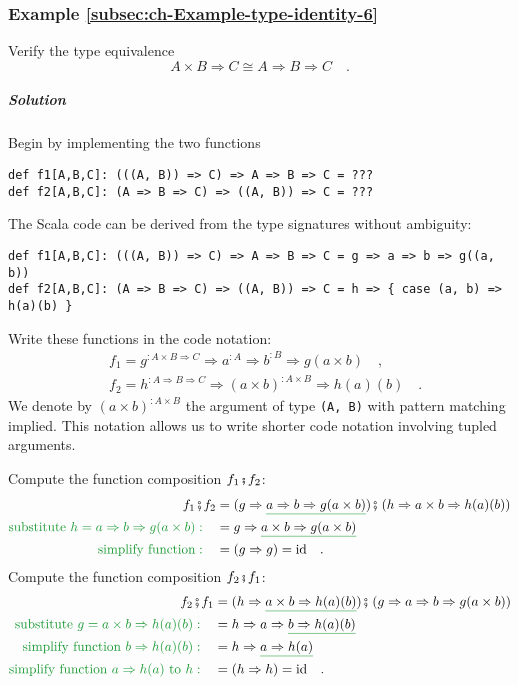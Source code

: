 \subsubsection{Example \label{subsec:ch-Example-type-identity-6}\ref{subsec:ch-Example-type-identity-6}}

Verify the type equivalence 
\[
A\times B\Rightarrow C\cong A\Rightarrow B\Rightarrow C\quad.
\]


\subparagraph{Solution}

Begin by implementing the two functions
\begin{lstlisting}
def f1[A,B,C]: (((A, B)) => C) => A => B => C = ???
def f2[A,B,C]: (A => B => C) => ((A, B)) => C = ???
\end{lstlisting}
The Scala code can be derived from the type signatures without ambiguity:
\begin{lstlisting}
def f1[A,B,C]: (((A, B)) => C) => A => B => C = g => a => b => g((a, b))
def f2[A,B,C]: (A => B => C) => ((A, B)) => C = h => { case (a, b) => h(a)(b) }
\end{lstlisting}
Write these functions in the code notation:
\begin{align*}
 & f_{1}=g^{:A\times B\Rightarrow C}\Rightarrow a^{:A}\Rightarrow b^{:B}\Rightarrow g(a\times b)\quad,\\
 & f_{2}=h^{:A\Rightarrow B\Rightarrow C}\Rightarrow\left(a\times b\right)^{:A\times B}\Rightarrow h(a)(b)\quad.
\end{align*}
We denote by $\left(a\times b\right)^{:A\times B}$ the argument of
type \lstinline!(A, B)! with pattern matching implied. This notation
allows us to write shorter code notation involving tupled arguments.

Compute the function composition $f_{1}\bef f_{2}$:
\begin{align*}
f_{1}\bef f_{2} & =(g\Rightarrow\gunderline{a\Rightarrow b\Rightarrow g(a\times b)})\bef\left(h\Rightarrow a\times b\Rightarrow h(a)(b)\right)\\
{\color{greenunder}\text{substitute }h=a\Rightarrow b\Rightarrow g(a\times b):}\quad & =g\Rightarrow\gunderline{a\times b\Rightarrow g(a\times b)}\\
{\color{greenunder}\text{simplify function}:}\quad & =\left(g\Rightarrow g\right)=\text{id}\quad.
\end{align*}
Compute the function composition $f_{2}\bef f_{1}$:
\begin{align*}
f_{2}\bef f_{1} & =(h\Rightarrow\gunderline{a\times b\Rightarrow h(a)(b)})\bef\left(g\Rightarrow a\Rightarrow b\Rightarrow g(a\times b)\right)\\
{\color{greenunder}\text{substitute }g=a\times b\Rightarrow h(a)(b):}\quad & =h\Rightarrow a\Rightarrow\gunderline{b\Rightarrow h(a)(b)}\\
{\color{greenunder}\text{simplify function }b\Rightarrow h(a)(b):}\quad & =h\Rightarrow\gunderline{a\Rightarrow h(a)}\\
{\color{greenunder}\text{simplify function }a\Rightarrow h(a)\text{ to }h:}\quad & =\left(h\Rightarrow h\right)=\text{id}\quad.
\end{align*}


